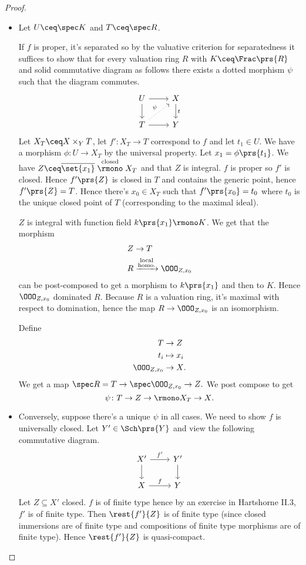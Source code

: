 \documentclass[10pt,a4paper,twoside,openany,hidelinks]{book}
\begin{document}
\begin{proof}
\begin{itemize}
\item
Let $U \ceq \spec K$ and $T \ceq \spec R$.

If $f$ is proper, it's separated so by the valuative criterion for separatedness it suffices to show that for every valuation ring $R$ with $K \ceq \Frac\prs{R}$ and solid commutative diagram as follows there exists a dotted morphism $\psi$ such that the diagram commutes.
\[
\begin{tikzcd}
U \arrow[r] \arrow[d] & X \arrow[d,"t"] \\ T \arrow[r] \arrow[ur, dotted,"\psi"] & Y
\end{tikzcd}
\]
Let $X_T \ceq X \times_Y T$, let $f' \colon X_T \to T$ correspond to $f$ and let $t_1 \in U$. We have a morphism $\phi \colon U \to X_T$ by the universal property. Let $x_1 = \phi\prs{t_1}$. We have $Z \ceq \overline{\set{x_1}} \stackrel{\text{closed}}{\rmono} X_T$ and that $Z$ is integral. $f$ is proper so $f'$ is closed. Hence $f'\prs{Z}$ is closed in $T$ and contains the generic point, hence $f'\prs{Z} = T$.
Hence there's $x_0 \in X_T$ such that $f'\prs{x_0} = t_0$ where $t_0$ is the unique closed point of $T$ (corresponding to the maximal ideal).

$Z$ is integral with function field $k\prs{x_1} \rmono K$. We get that the morphism
\begin{align*}
Z &\to T \\
R &\xrightarrow{\substack{\text{local} \\ \text{homo.}}} \OOO_{Z, x_0}
\end{align*}
can be post-composed to get a morphism to $k\prs{x_1}$ and then to $K$.
Hence $\OOO_{Z,x_0}$ dominated $R$.
Because $R$ is a valuation ring, it's maximal with respect to domination, hence the map $R \to \OOO_{Z,x_0}$ is an isomorphism.

Define
\begin{align*}
T &\to Z \\
t_i &\mapsto x_i \\
\OOO_{Z,x_0} &\to X \text{.}
\end{align*}
We get a map $\spec R = T \to \spec\OOO_{Z,x_0} \to Z \text{.}$
We post compose to get \[\psi \colon T \to Z \to \rmono X_T \to X \text{.}\]
\item Conversely, suppose there's a unique $\psi$ in all cases. We need to show $f$ is universally closed.
Let $Y' \in \Sch\prs{Y}$ and view the following commutative diagram.
\[
\begin{tikzcd}
X' \arrow[r, "f'"] \arrow[d] & Y' \arrow[d] \\
X \arrow[r, "f"] & Y
\end{tikzcd}
\]
Let $Z \subseteq X'$ closed. $f$ is of finite type hence by an exercise in Hartshorne II.3, $f'$ is of finite type. Then $\rest{f'}{Z}$ is of finite type (since closed immersions are of finite type and compositions of finite type morphisms are of finite type).
Hence $\rest{f'}{Z}$ is quasi-compact.


\end{itemize}
\end{proof}
\end{document}
